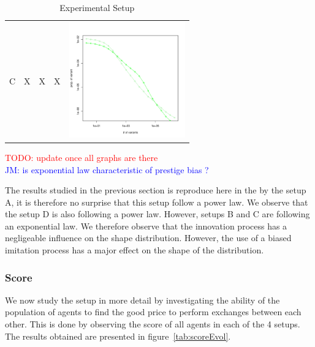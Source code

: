 \documentclass{wscpaperproc}
\newcommand{\memo}[2]{\textcolor{#1}{#2}}
\newcommand{\todo}[1]{\memo{red}{TODO: #1\\}}
\newcommand{\jm}[1]{\memo{blue}{JM: #1\\}}
\begin{document}
\begin{table}[h]
\begin{tabular}{lcccc}
C & X& X & X &\includegraphics[width=5cm]{img/C-D.pdf}\\
	\end{tabular}
	\caption{Experimental Setup}
	\label{tab:allRes}
\end{table}

\todo{update once all graphs are there}
\jm{is exponential law characteristic of prestige bias ?}

The results studied in the previous section is reproduce here in the by the setup A, it is therefore no surprise that this setup follow a power law. We observe that the setup D is also following a power law. However, setups B and C are following an exponential law. We therefore observe that the innovation process has a negligeable influence on the shape distribution. However, the use of a biased imitation process has a major effect on the shape of the distribution.



\subsubsection{Score}

We now study the setup in more detail by investigating the ability of the population of agents to find the good price to perform exchanges between each other. This is done by observing the score of all agents in each of the 4 setups. The results obtained are presented in figure~\ref{tab:scoreEvol}.
\end{document}
